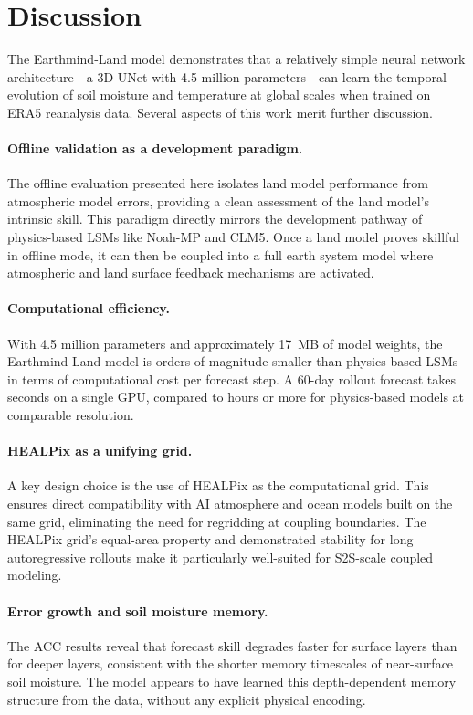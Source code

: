 \documentclass[11pt]{article}
\begin{document}
\section{Discussion}
\label{sec:discussion}

The Earthmind-Land model demonstrates that a relatively simple neural network architecture---a 3D UNet with 4.5 million parameters---can learn the temporal evolution of soil moisture and temperature at global scales when trained on ERA5 reanalysis data. Several aspects of this work merit further discussion.

\paragraph{Offline validation as a development paradigm.} The offline evaluation presented here isolates land model performance from atmospheric model errors, providing a clean assessment of the land model's intrinsic skill. This paradigm directly mirrors the development pathway of physics-based LSMs like Noah-MP \citep{niu2011noahmp} and CLM5. Once a land model proves skillful in offline mode, it can then be coupled into a full earth system model where atmospheric and land surface feedback mechanisms are activated.

\paragraph{Computational efficiency.} With 4.5 million parameters and approximately 17~MB of model weights, the Earthmind-Land model is orders of magnitude smaller than physics-based LSMs in terms of computational cost per forecast step. A 60-day rollout forecast takes seconds on a single GPU, compared to hours or more for physics-based models at comparable resolution.

\paragraph{HEALPix as a unifying grid.} A key design choice is the use of HEALPix as the computational grid. This ensures direct compatibility with AI atmosphere and ocean models built on the same grid, eliminating the need for regridding at coupling boundaries. The HEALPix grid's equal-area property and demonstrated stability for long autoregressive rollouts make it particularly well-suited for S2S-scale coupled modeling.

\paragraph{Error growth and soil moisture memory.} The ACC results reveal that forecast skill degrades faster for surface layers than for deeper layers, consistent with the shorter memory timescales of near-surface soil moisture. The model appears to have learned this depth-dependent memory structure from the data, without any explicit physical encoding.
\end{document}
